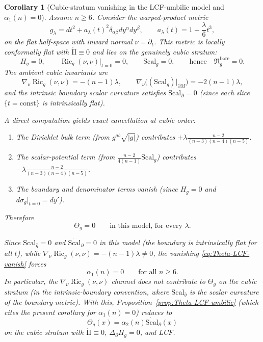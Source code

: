 \documentclass[11pt,reqno,a4paper]{amsart}
\DeclareMathOperator{\Ric}{Ric}
\numberwithin{equation}{section}
\theoremstyle{plain}
\newtheorem{corollary}[theorem]{Corollary}
\newcommand{\Scal}{\mathrm{Scal}}
\theoremstyle{remark}
\theoremstyle{plain}
\begin{document}
\begin{corollary}[Cubic-stratum vanishing in the LCF-umbilic model and $\alpha_1(n)=0$]\label{cor:Theta-LCF-vanish}
Assume $n\ge6$. Consider the warped-product metric
\[
g_\lambda=dt^2+a_\lambda(t)^2\delta_{\alpha\beta}dy^\alpha dy^\beta,
\qquad a_\lambda(t)=1+\frac{\lambda}{6}t^3,
\]
on the flat half-space with inward normal $\nu=\partial_t$.
This metric is locally conformally flat with $\mathring{\mathrm{II}}\equiv0$
and lies on the genuinely cubic stratum:
\[
H_g=0,\qquad \Ric_g(\nu,\nu)\big|_{t=0}=0,\qquad \Scal_{\bar g}=0,
\qquad\text{hence}\quad \mathfrak R_g^{\mathrm{bare}}=0.
\]
The ambient cubic invariants are
\[
\nabla_\nu\Ric_g(\nu,\nu)=-(n-1)\lambda,\qquad
\nabla_\nu\bigl((\Scal_g)|_{\partial M}\bigr)=-2(n-1)\lambda,
\]
and the intrinsic boundary scalar curvature satisfies $\dot{\Scal}_\partial=0$
(since each slice $\{t=\mathrm{const}\}$ is intrinsically flat).

A direct computation yields \emph{exact cancellation} at cubic order:
\begin{enumerate}[label=(\roman*),leftmargin=1.25em]
\item The Dirichlet bulk term (from $g^{ab}\sqrt{|g|}$) contributes
$+\lambda\frac{n-2}{(n-3)(n-4)(n-5)}$.
\item The scalar-potential term (from $\frac{n-2}{4(n-1)}\Scal_g$) contributes
$-\lambda\frac{n-2}{(n-3)(n-4)(n-5)}$.
\item The boundary and denominator terms vanish (since $H_g=0$ and $d\sigma_g|_{t=0}=dy'$).
\end{enumerate}
Therefore
\begin{equation}\label{eq:Theta-LCF-vanish}
\Theta_g=0\qquad\text{in this model, for every }\lambda.
\end{equation}

Since $\Scal_{\bar g}=0$ and $\dot{\Scal}_\partial=0$ in this model
(the boundary is intrinsically flat for all $t$), while $\nabla_\nu\Ric_g(\nu,\nu)=-(n-1)\lambda\neq0$,
the vanishing \eqref{eq:Theta-LCF-vanish} forces
\begin{equation}\label{eq:alpha1-zero}
\boxed{\alpha_1(n)=0\qquad\text{for all }n\ge6.}
\end{equation}
In particular, the $\nabla_\nu\Ric_g(\nu,\nu)$ channel does not contribute to $\Theta_g$ on the cubic stratum
(in the intrinsic-boundary convention, where $\Scal_{\bar g}$ is the scalar curvature of the boundary metric).
With this, Proposition~\ref{prop:Theta-LCF-umbilic} (which cites the
present corollary for $\alpha_1(n)=0$) reduces to
\[
\Theta_g(x)=\alpha_2(n)\dot{\Scal}_\partial(x)
\]
on the cubic stratum with $\mathring{\mathrm{II}}\equiv0$, $\Delta_\partial H_g=0$, and LCF.
\end{corollary}
\end{document}

